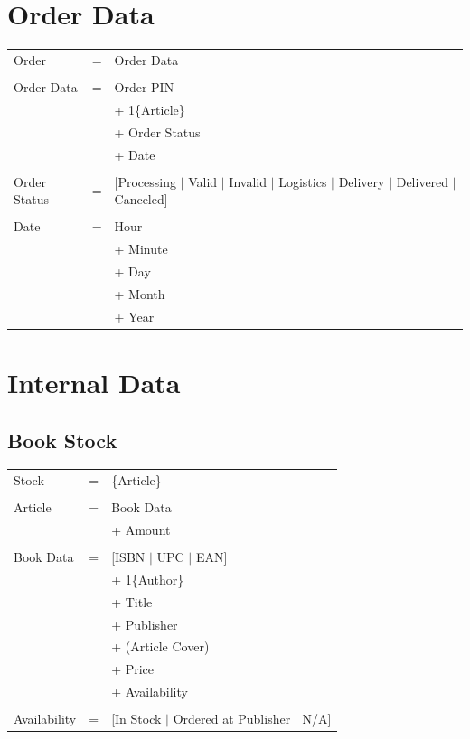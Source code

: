 \documentclass[11pt,a4paper,oneside,svgnames]{report}
\begin{document}
\section{Order Data}

\begin{longtable}{p{3.5cm}p{0.5cm}p{8.5cm}}
Order & = & Order Data\\
\\
Order Data & = & Order PIN\\
&  & + 1\{Article\}\\
&  & + Order Status\\
&  & + Date \\
\\
Order Status & = & [Processing $|$ Valid $|$ Invalid $|$ Logistics $|$ Delivery $|$ Delivered $|$ Canceled] \\
\\
Date & = & Hour\\
&  & + Minute\\
&  & + Day\\
&  & + Month\\
&  & + Year\\
\end{longtable}

\section{Internal Data}

\subsection{Book Stock}
\begin{longtable}{p{3.5cm}p{0.5cm}p{8.5cm}}
Stock & = & \{Article\} \\
\\
Article & = & Book Data\\
&  & + Amount\\
\\
Book Data & = & [ISBN $|$ UPC $|$ EAN]\\
&  & + 1\{Author\}\\
&  & + Title\\
&  & + Publisher\\
&  & + (Article Cover)\\
&  & + Price\\
&  & + Availability\\
\\
Availability & = & [In Stock $|$ Ordered at Publisher $|$ N/A]\\
\end{longtable}
\end{document}
